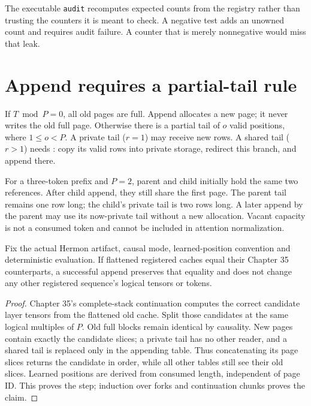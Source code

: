 

The executable \texttt{audit} recomputes expected counts from the registry
rather than trusting the counters it is meant to check. A negative test
adds an unowned count and requires audit failure. A counter that is merely
nonnegative would miss that leak.

\section{Append requires a partial-tail rule}
\label{evod36:cow}
If $T\bmod P=0$, all old pages are full. Append allocates a new page; it
never writes the old full page. Otherwise there is a partial tail of $o$
valid positions, where $1\le o<P$. A private tail ($r=1$) may receive new
rows. A shared tail ($r>1$) needs : copy its valid
rows into private storage, redirect this branch, and append there.

For a three-token prefix and $P=2$, parent and child initially hold the
same two references. After child append, they still share the first page.
The parent tail remains one row long; the child's private tail is two rows
long. A later append by the parent may use its now-private tail without a
new allocation. Vacant capacity is not a consumed token and cannot be
included in attention normalization.


\begin{proposition}
Fix the actual Hermon artifact, causal mode, learned-position convention
and deterministic evaluation. If flattened registered caches equal their
Chapter 35 counterparts, a successful append preserves that equality and
does not change any other registered sequence's logical tensors or tokens.
\end{proposition}
\begin{proof}
Chapter 35's complete-stack continuation computes the correct candidate
layer tensors from the flattened old cache. Split those candidates at
the same logical multiples of $P$. Old full blocks remain identical by
causality. New pages contain exactly the candidate slices; a private tail
has no other reader, and a shared tail is replaced only in the appending
table. Thus concatenating its page slices returns the candidate in order,
while all other tables still see their old slices. Learned positions are
derived from consumed length, independent of page ID. This proves the
step; induction over forks and continuation chunks proves the claim.
\end{proof}

